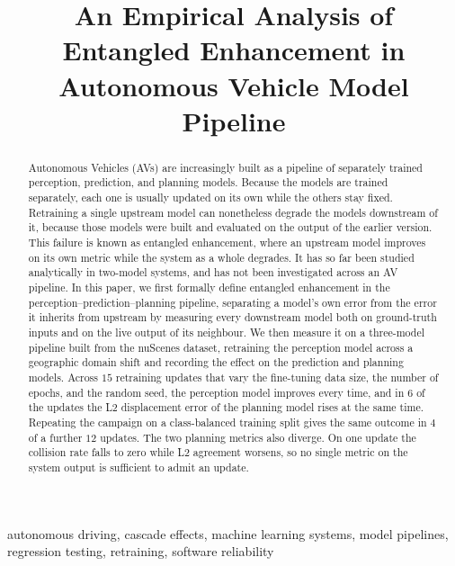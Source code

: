 \documentclass[conference]{IEEEtran}
\title{An Empirical Analysis of Entangled Enhancement in Autonomous Vehicle Model Pipeline}
\author{\IEEEauthorblockN{Rashedul Arefin Ifty, Fumio Machida}
\IEEEauthorblockA{University of Tsukuba\\
Tsukuba, Japan\\
ifty.rashedul@sd.cs.tsukuba.ac.jp, machida@cs.tsukuba.ac.jp}}
\begin{document}
\maketitle
\thispagestyle{empty}

\begin{abstract}
Autonomous Vehicles (AVs) are increasingly built as a pipeline of separately
trained perception, prediction, and planning models. Because the models are
trained separately, each one is usually updated on its own while the others stay
fixed. Retraining a single upstream model can nonetheless degrade the models
downstream of it, because those models were built and evaluated on the output of
the earlier version. This failure is known as entangled enhancement, where an
upstream model improves on its own metric while the system as a whole degrades.
It has so far been studied analytically in two-model systems, and has not been
investigated across an AV pipeline. In this paper, we first formally define
entangled enhancement in the perception--prediction--planning pipeline,
separating a model's own error from the error it inherits from upstream by
measuring every downstream model both on ground-truth inputs and on the live
output of its neighbour. We then measure it on a three-model pipeline built from
the nuScenes dataset, retraining the perception model across a geographic domain
shift and recording the effect on the prediction and planning models. Across $15$
retraining updates that vary the fine-tuning data size, the number of epochs, and
the random seed, the perception model improves every time, and in $6$ of the
updates the L2 displacement error of the planning model rises at the same time.
Repeating the campaign on a class-balanced training split gives the same outcome
in $4$ of a further $12$ updates. The two planning metrics also diverge. On one
update the collision rate falls to zero while L2 agreement worsens, so no single
metric on the system output is sufficient to admit an update.
\end{abstract}

\begin{IEEEkeywords}
autonomous driving, cascade effects, machine learning systems, model pipelines,
regression testing, retraining, software reliability
\end{IEEEkeywords}

\end{document}
